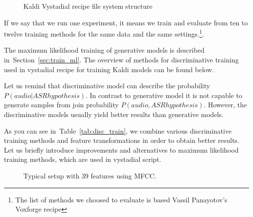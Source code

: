 \begin{figure}[!htp]
\centering \theverbbox \caption{\small{Kaldi Vystadial recipe file system structure}}
\label{fig:ascii-box}
\end{figure}

If we say that we run one experiment, it means we train and evaluate from ten to twelve training methods 
for the same data and the same settings.\footnote{The list of methods we choosed to evaluate is based Vassil Panayotov's Voxforge recipe}.

The maximum likelihood training of generative models is described in~Section~\ref{sec:train_ml}.
The overview of methods for discriminative training used in vystadial recipe for training Kaldi models
can be found below.

Let us remind that discriminative model can describe the probability $P(audio|ASR hypothesis)$.
In contrast to generative model it is not capable to generate samples from join probability $P(audio, ASR hypothesis)$. However, the discriminative models usually yield better results than generative models. 

As you can see in~Table~\ref{tab:disc_train}, we combine various discriminative training methods
and feature transformations in order to obtain better results. 
Let us briefly introduce improvements and alternatives to maximum likelihood training methods,
which are used in vystadial script.

\begin{figure}
    \begin{center}
    
    \caption{Typical setup with 39 features using \ac{MFCC}.}
    \label{fig:delta} 
    \end{center}
\end{figure}

